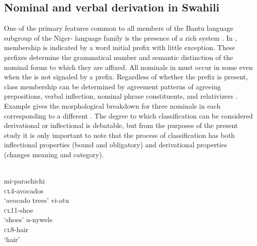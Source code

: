 \documentclass[output=paper,modfonts]{langscibook}
\begin{document}
\subsection{Nominal and verbal derivation in Swahili}\label{sec:kloehn:1.1}


One of the primary features common to all members of the Bantu language subgroup of the Niger- language family is the presence of a rich  system \citep{Heine1982}. In ,  membership is indicated by a word initial prefix with little exception. These prefixes determine the grammatical number and semantic distinction of the nominal forms to which they are affixed. All nominals in  must occur in some  even when the  is not signaled by a prefix. Regardless of whether the prefix is present, class membership can be determined by agreement patterns of agreeing prepositions, verbal inflection, nominal phrase constituents, and relativizers \citep{Mohamed2001}. Example  gives the morphological breakdown for three nominals in  each corresponding to a different . The degree to which  classification can be considered derivational or inflectional is debatable, but from the purposes of the present study it is only important to note that the process of  classification has both inflectional properties (bound and obligatory) and derivational properties (changes meaning and category).


\ea\label{ex:kloehn:1}
\\
\ea 
mi-parachichi\\
\textsc{cl4}-avocados\\
\glt ‘avocado trees’ 
\ex 
vi-atu\\
\textsc{cl11}-shoe\\
\glt ‘shoes’ 
\ex
\gll u-nywele\\
\textsc{cl8}-hair\\
\glt ‘hair’
\z
\z
\end{document}
